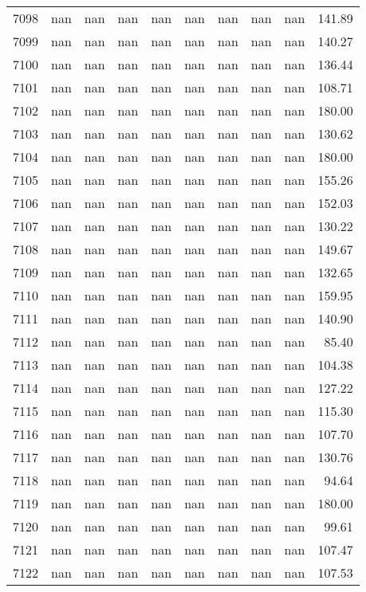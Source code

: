 \begin{tabular}{lrrrrrrrrr}
7098 & nan & nan & nan & nan & nan & nan & nan & nan & 141.89 \\
7099 & nan & nan & nan & nan & nan & nan & nan & nan & 140.27 \\
7100 & nan & nan & nan & nan & nan & nan & nan & nan & 136.44 \\
7101 & nan & nan & nan & nan & nan & nan & nan & nan & 108.71 \\
7102 & nan & nan & nan & nan & nan & nan & nan & nan & 180.00 \\
7103 & nan & nan & nan & nan & nan & nan & nan & nan & 130.62 \\
7104 & nan & nan & nan & nan & nan & nan & nan & nan & 180.00 \\
7105 & nan & nan & nan & nan & nan & nan & nan & nan & 155.26 \\
7106 & nan & nan & nan & nan & nan & nan & nan & nan & 152.03 \\
7107 & nan & nan & nan & nan & nan & nan & nan & nan & 130.22 \\
7108 & nan & nan & nan & nan & nan & nan & nan & nan & 149.67 \\
7109 & nan & nan & nan & nan & nan & nan & nan & nan & 132.65 \\
7110 & nan & nan & nan & nan & nan & nan & nan & nan & 159.95 \\
7111 & nan & nan & nan & nan & nan & nan & nan & nan & 140.90 \\
7112 & nan & nan & nan & nan & nan & nan & nan & nan & 85.40 \\
7113 & nan & nan & nan & nan & nan & nan & nan & nan & 104.38 \\
7114 & nan & nan & nan & nan & nan & nan & nan & nan & 127.22 \\
7115 & nan & nan & nan & nan & nan & nan & nan & nan & 115.30 \\
7116 & nan & nan & nan & nan & nan & nan & nan & nan & 107.70 \\
7117 & nan & nan & nan & nan & nan & nan & nan & nan & 130.76 \\
7118 & nan & nan & nan & nan & nan & nan & nan & nan & 94.64 \\
7119 & nan & nan & nan & nan & nan & nan & nan & nan & 180.00 \\
7120 & nan & nan & nan & nan & nan & nan & nan & nan & 99.61 \\
7121 & nan & nan & nan & nan & nan & nan & nan & nan & 107.47 \\
7122 & nan & nan & nan & nan & nan & nan & nan & nan & 107.53 \\

\end{tabular}
